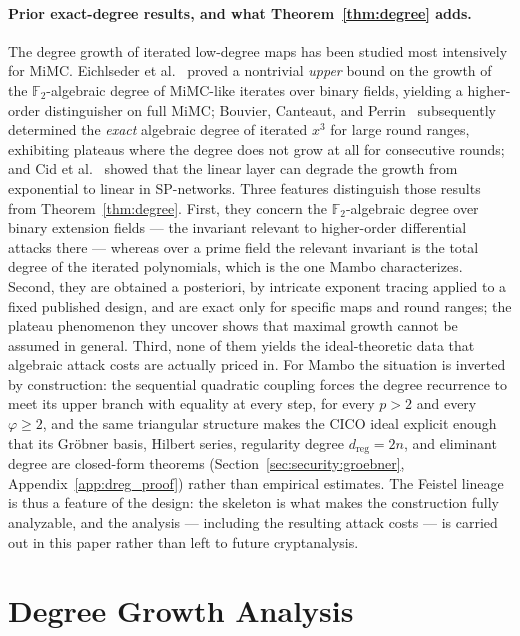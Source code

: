 \documentclass[11pt,a4paper]{article}
\theoremstyle{definition}
\begin{document}
\paragraph{Prior exact-degree results, and what
Theorem~\ref{thm:degree} adds.}
The degree growth of iterated low-degree maps has been studied most
intensively for MiMC. Eichlseder et
al.~\cite{MiMC_fulldegree} proved a nontrivial \emph{upper} bound on
the growth of the $\mathbb{F}_2$-algebraic degree of MiMC-like
iterates over binary fields, yielding a higher-order distinguisher on
full MiMC; Bouvier, Canteaut, and Perrin~\cite{MiMC_exactdegree}
subsequently determined the \emph{exact} algebraic degree of iterated
$x^3$ for large round ranges, exhibiting plateaus where the degree
does not grow at all for consecutive rounds; and Cid et
al.~\cite{Cid_linlayer} showed that the linear layer can degrade the
growth from exponential to linear in SP-networks. Three features
distinguish those results from Theorem~\ref{thm:degree}. First, they
concern the $\mathbb{F}_2$-algebraic degree over binary extension
fields --- the invariant relevant to higher-order differential
attacks there --- whereas over a prime field the relevant invariant is
the total degree of the iterated polynomials, which is the one Mambo
characterizes. Second, they are obtained a posteriori, by intricate
exponent tracing applied to a fixed published design, and are exact
only for specific maps and round ranges; the plateau phenomenon they
uncover shows that maximal growth cannot be assumed in general.
Third, none of them yields the ideal-theoretic data that algebraic
attack costs are actually priced in. For Mambo the situation is
inverted by construction: the sequential quadratic coupling forces the
degree recurrence to meet its upper branch with equality at every
step, for every $p > 2$ and every $\varphi \ge 2$, and the same
triangular structure makes the CICO ideal explicit enough that its
Gr\"obner basis, Hilbert series, regularity degree $d_{\mathrm{reg}} =
2n$, and eliminant degree are closed-form theorems
(Section~\ref{sec:security:groebner},
Appendix~\ref{app:dreg_proof}) rather than empirical estimates. The
Feistel lineage is thus a feature of the design: the skeleton is what
makes the construction fully analyzable, and the analysis ---
including the resulting attack costs --- is carried out in this paper
rather than left to future cryptanalysis.


\section{Degree Growth Analysis}\label{sec:degree}
\end{document}
